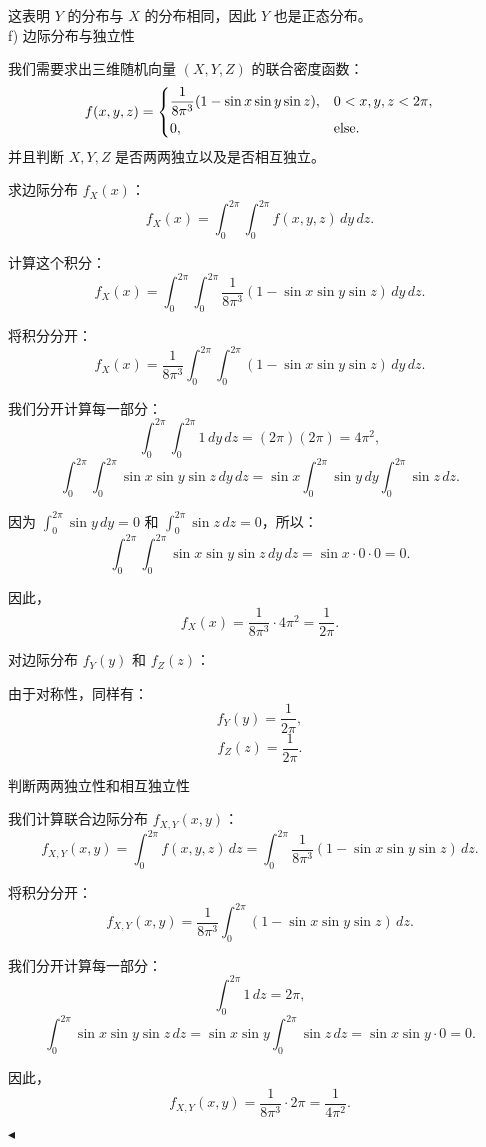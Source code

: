 \documentclass[11pt]{article}
\newenvironment{question}[2][Question]{\begin{trivlist}
\item[\hskip \labelsep {\bfseries #1}\hskip \labelsep {\bfseries #2.}]}{\hfill$\blacktriangleleft$\end{trivlist}}
\begin{document}
\begin{question}{2 (30') (独立性)}
这表明 \(Y\) 的分布与 \(X\) 的分布相同，因此 \(Y\) 也是正态分布。\\

f) 边际分布与独立性

我们需要求出三维随机向量 \((X, Y, Z)\) 的联合密度函数：
\[ f(x, y, z) = \begin{dcases}
\frac{1}{8\pi^3}(1 - \sin{x}\sin{y}\sin{z}), & 0 < x, y, z < 2\pi, \\
0, & \mathrm{else}.
\end{dcases} \]
并且判断 \(X, Y, Z\) 是否两两独立以及是否相互独立。

求边际分布
 \(f_X(x)\)：
\[ f_X(x) = \int_0^{2\pi} \int_0^{2\pi} f(x, y, z) \, dy \, dz. \]

计算这个积分：
\[ f_X(x) = \int_0^{2\pi} \int_0^{2\pi} \frac{1}{8\pi^3}(1 - \sin{x}\sin{y}\sin{z}) \, dy \, dz. \]

将积分分开：
\[ f_X(x) = \frac{1}{8\pi^3} \int_0^{2\pi} \int_0^{2\pi} (1 - \sin{x}\sin{y}\sin{z}) \, dy \, dz. \]

我们分开计算每一部分：
\[ \int_0^{2\pi} \int_0^{2\pi} 1 \, dy \, dz = (2\pi)(2\pi) = 4\pi^2, \]
\[ \int_0^{2\pi} \int_0^{2\pi} \sin{x}\sin{y}\sin{z} \, dy \, dz = \sin{x} \int_0^{2\pi} \sin{y} \, dy \int_0^{2\pi} \sin{z} \, dz. \]

因为 \(\int_0^{2\pi} \sin{y} \, dy = 0\) 和 \(\int_0^{2\pi} \sin{z} \, dz = 0\)，所以：
\[ \int_0^{2\pi} \int_0^{2\pi} \sin{x}\sin{y}\sin{z} \, dy \, dz = \sin{x} \cdot 0 \cdot 0 = 0. \]

因此，
\[ f_X(x) = \frac{1}{8\pi^3} \cdot 4\pi^2 = \frac{1}{2\pi}. \]

对边际分布 \(f_Y(y)\) 和 \(f_Z(z)\)：

由于对称性，同样有：
\[ f_Y(y) = \frac{1}{2\pi}, \]
\[ f_Z(z) = \frac{1}{2\pi}. \]

判断两两独立性和相互独立性

我们计算联合边际分布 \(f_{X,Y}(x,y)\)：
\[ f_{X,Y}(x,y) = \int_0^{2\pi} f(x,y,z) \, dz = \int_0^{2\pi} \frac{1}{8\pi^3}(1 - \sin{x}\sin{y}\sin{z}) \, dz. \]

将积分分开：
\[ f_{X,Y}(x,y) = \frac{1}{8\pi^3} \int_0^{2\pi} (1 - \sin{x}\sin{y}\sin{z}) \, dz. \]

我们分开计算每一部分：
\[ \int_0^{2\pi} 1 \, dz = 2\pi, \]
\[ \int_0^{2\pi} \sin{x}\sin{y}\sin{z} \, dz = \sin{x}\sin{y} \int_0^{2\pi} \sin{z} \, dz = \sin{x}\sin{y} \cdot 0 = 0. \]

因此，
\[ f_{X,Y}(x,y) = \frac{1}{8\pi^3} \cdot 2\pi = \frac{1}{4\pi^2}. \]


\end{question}
\end{document}
